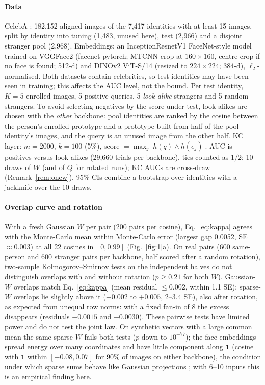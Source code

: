 \documentclass[preprint,12pt,authoryear]{elsarticle}
\theoremstyle{remark}
\begin{document}
\paragraph{Data} CelebA \citep{liu2015}: 182,152 aligned images of the 7,417 identities with at least 15 images,
split by identity into tuning (1,483, unused here), test (2,966) and a disjoint stranger pool (2,968).
Embeddings: an InceptionResnetV1 FaceNet-style model \citep{schroff2015} trained on VGGFace2 \citep{cao2018}
(facenet-pytorch; MTCNN crop at $160\times160$, centre crop if no face is found; 512-d) and DINOv2 ViT-S/14
\citep{oquab2023} (resized to $224\times224$; 384-d), $\ell_2$-normalised. Both datasets contain celebrities, so
test identities may have been seen in training; this affects the AUC level, not the bound. Per test identity,
$K=5$ enrolled images, 5 positive queries, 5 \emph{look-alike} strangers and 5 random strangers. To avoid
selecting negatives by the score under test, look-alikes are chosen with the \emph{other} backbone: pool
identities are ranked by the cosine between the person's enrolled prototype and a prototype built from half of
the pool identity's images, and the query is an unused image from the other half. KC layer: $m=2000$, $k=100$
(5\%), score $=\max_j |h(q)\wedge h(e_j)|$. AUC is positives versus look-alikes (29,660 trials per backbone), ties
counted as 1/2; 10 draws of $W$ (and of $Q$ for rotated runs); KC AUCs are cross-draw (Remark~\ref{rem:onew}).
95\% CIs combine a bootstrap over identities with a jackknife over the 10 draws.

\paragraph{Overlap curve and rotation} With a fresh Gaussian $W$ per pair (200 pairs per cosine), Eq.~\eqref{eq:kappa}
agrees with the Monte-Carlo mean within Monte-Carlo error (largest gap 0.0052, SE $\approx0.003$) at all 22
cosines in $[0,0.99]$ (Fig.~\ref{fig:1}a). On real pairs (600 same-person and 600 stranger pairs per backbone,
half scored after a random rotation), two-sample Kolmogorov--Smirnov tests on the independent halves do not
distinguish overlaps with and without rotation ($p\ge0.21$ for both $W$). Gaussian-$W$ overlaps match
Eq.~\eqref{eq:kappa} (mean residual $\le0.002$, within 1.1 SE); sparse-$W$ overlaps lie slightly above it
($+0.002$ to $+0.005$, 2--3.4 SE), also after rotation, as expected from unequal row norms: with a fixed fan-in of
8 the excess disappears (residuals $-0.0015$ and $-0.0030$). These pairwise tests have limited power and do not
test the joint law. On synthetic vectors with a large common mean the same sparse $W$ fails both tests ($p$ down
to $10^{-77}$); the face embeddings spread energy over many coordinates and have little component along
$\mathbf 1$ (cosine with $\mathbf 1$ within $[-0.08,0.07]$ for 90\% of images on either backbone), the condition
under which sparse sums behave like Gaussian projections \citep{li2006}; with 6--10 inputs this is an empirical
finding here.
\end{document}
